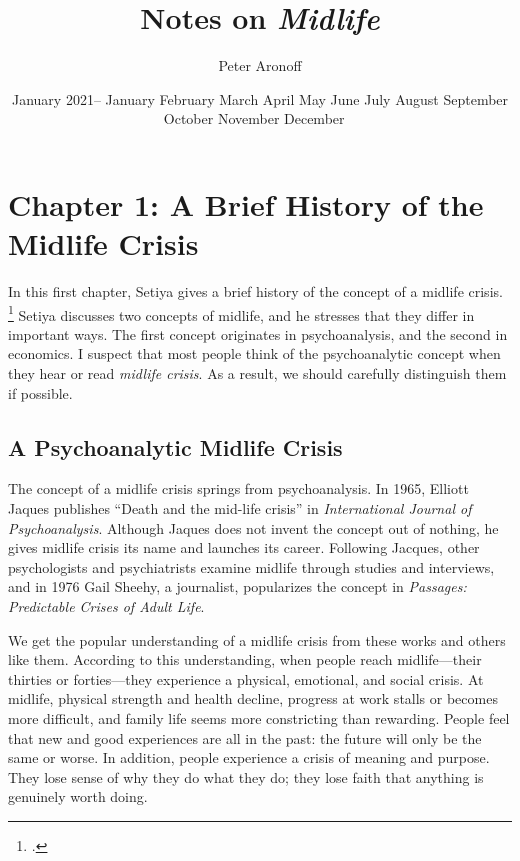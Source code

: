 \documentclass[12pt,letterpaper]{article}
\newcommand{\MONTH}{%
  \ifcase\the\month
  \or January%
  \or February%
  \or March%
  \or April%
  \or May%
  \or June%
  \or July%
  \or August%
  \or September%
  \or October%
  \or November%
  \or December%
  \fi}
\begin{document}
\begin{titlepage}
    \title{Notes on \textit{Midlife}}
    \author{Peter Aronoff}
    \date{January 2021--\MONTH\ \the\year}
    \maketitle
    \thispagestyle{empty}
\end{titlepage}

\pagestyle{notes}

\section*{Chapter 1: A Brief History of the Midlife Crisis}

In this first chapter, Setiya gives a brief history of the concept of a midlife crisis.%
\footcite[Unless I say otherwise, all citations refer to][]{midlife-setiya-2017}
Setiya discusses two concepts of midlife, and he stresses that they differ in important ways.
The first concept originates in psychoanalysis, and the second in economics.
I suspect that most people think of the psychoanalytic concept when they hear or read \textit{midlife crisis}.
As a result, we should carefully distinguish them if possible.

\subsection*{A Psychoanalytic Midlife Crisis}

The concept of a midlife crisis springs from psychoanalysis.
In 1965, Elliott Jaques publishes ``Death and the mid-life crisis'' in \textit{International Journal of Psychoanalysis}.
Although Jaques does not invent the concept out of nothing, he gives midlife crisis its name and launches its career.
Following Jacques, other psychologists and psychiatrists examine midlife through studies and interviews, and in 1976 Gail Sheehy, a journalist, popularizes the concept in \textit{Passages: Predictable Crises of Adult Life}.

We get the popular understanding of a midlife crisis from these works and others like them.
According to this understanding, when people reach midlife---their thirties or forties---they experience a physical, emotional, and social crisis.
At midlife, physical strength and health decline, progress at work stalls or becomes more difficult, and family life seems more constricting than rewarding.
People feel that new and good experiences are all in the past: the future will only be the same or worse.
In addition, people experience a crisis of meaning and purpose.
They lose sense of why they do what they do; they lose faith that anything is genuinely worth doing.
\end{document}
